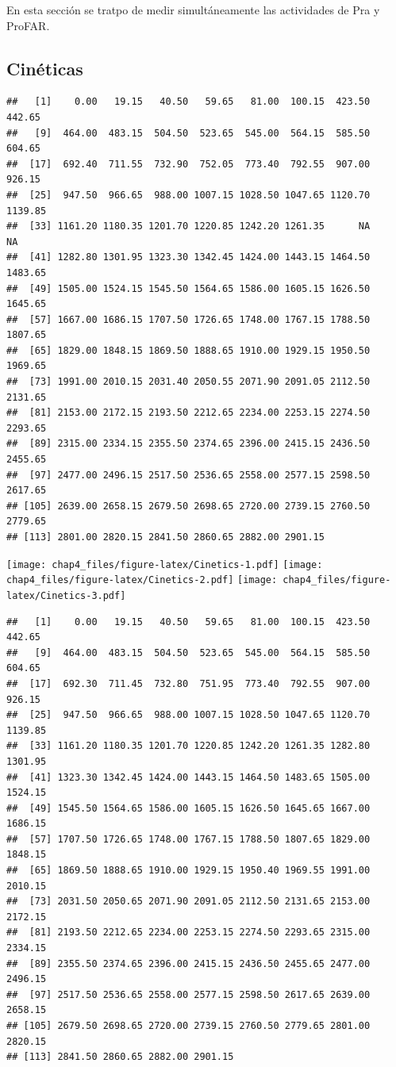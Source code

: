\documentclass[]{article}
\begin{document}
{En esta sección se tratpo de medir simultáneamente las actividades de
Pra y ProFAR.

\subsection{Cinéticas}\label{cineticas}

\begin{verbatim}
##   [1]    0.00   19.15   40.50   59.65   81.00  100.15  423.50  442.65
##   [9]  464.00  483.15  504.50  523.65  545.00  564.15  585.50  604.65
##  [17]  692.40  711.55  732.90  752.05  773.40  792.55  907.00  926.15
##  [25]  947.50  966.65  988.00 1007.15 1028.50 1047.65 1120.70 1139.85
##  [33] 1161.20 1180.35 1201.70 1220.85 1242.20 1261.35      NA      NA
##  [41] 1282.80 1301.95 1323.30 1342.45 1424.00 1443.15 1464.50 1483.65
##  [49] 1505.00 1524.15 1545.50 1564.65 1586.00 1605.15 1626.50 1645.65
##  [57] 1667.00 1686.15 1707.50 1726.65 1748.00 1767.15 1788.50 1807.65
##  [65] 1829.00 1848.15 1869.50 1888.65 1910.00 1929.15 1950.50 1969.65
##  [73] 1991.00 2010.15 2031.40 2050.55 2071.90 2091.05 2112.50 2131.65
##  [81] 2153.00 2172.15 2193.50 2212.65 2234.00 2253.15 2274.50 2293.65
##  [89] 2315.00 2334.15 2355.50 2374.65 2396.00 2415.15 2436.50 2455.65
##  [97] 2477.00 2496.15 2517.50 2536.65 2558.00 2577.15 2598.50 2617.65
## [105] 2639.00 2658.15 2679.50 2698.65 2720.00 2739.15 2760.50 2779.65
## [113] 2801.00 2820.15 2841.50 2860.65 2882.00 2901.15
\end{verbatim}

\texttt{[image: chap4\_files/figure-latex/Cinetics-1.pdf]}
\texttt{[image: chap4\_files/figure-latex/Cinetics-2.pdf]}
\texttt{[image: chap4\_files/figure-latex/Cinetics-3.pdf]}

\begin{verbatim}
##   [1]    0.00   19.15   40.50   59.65   81.00  100.15  423.50  442.65
##   [9]  464.00  483.15  504.50  523.65  545.00  564.15  585.50  604.65
##  [17]  692.30  711.45  732.80  751.95  773.40  792.55  907.00  926.15
##  [25]  947.50  966.65  988.00 1007.15 1028.50 1047.65 1120.70 1139.85
##  [33] 1161.20 1180.35 1201.70 1220.85 1242.20 1261.35 1282.80 1301.95
##  [41] 1323.30 1342.45 1424.00 1443.15 1464.50 1483.65 1505.00 1524.15
##  [49] 1545.50 1564.65 1586.00 1605.15 1626.50 1645.65 1667.00 1686.15
##  [57] 1707.50 1726.65 1748.00 1767.15 1788.50 1807.65 1829.00 1848.15
##  [65] 1869.50 1888.65 1910.00 1929.15 1950.40 1969.55 1991.00 2010.15
##  [73] 2031.50 2050.65 2071.90 2091.05 2112.50 2131.65 2153.00 2172.15
##  [81] 2193.50 2212.65 2234.00 2253.15 2274.50 2293.65 2315.00 2334.15
##  [89] 2355.50 2374.65 2396.00 2415.15 2436.50 2455.65 2477.00 2496.15
##  [97] 2517.50 2536.65 2558.00 2577.15 2598.50 2617.65 2639.00 2658.15
## [105] 2679.50 2698.65 2720.00 2739.15 2760.50 2779.65 2801.00 2820.15
## [113] 2841.50 2860.65 2882.00 2901.15
\end{verbatim}

}
\end{document}
